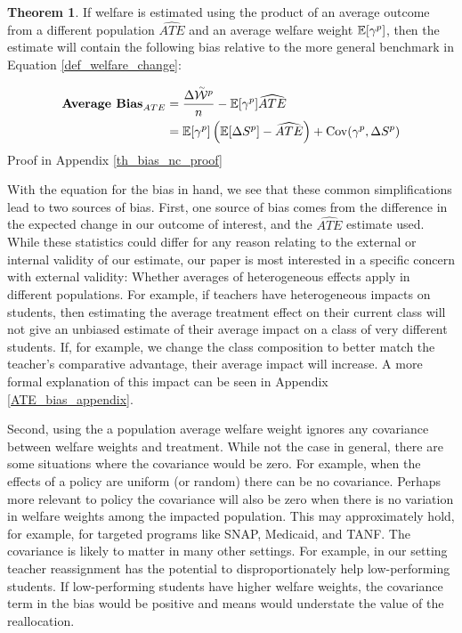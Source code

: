 \documentclass[12pt]{article}
\theoremstyle{definition}
\theoremstyle{definition}
\theoremstyle{definition}
\theoremstyle{definition}
\newtheorem{thm}{Theorem}
\begin{document}
\begin{thm}
\label{thm_bias_nc}
If welfare is estimated using the product of an average outcome from a different population $\widehat{ATE}$ and an average welfare weight $\mathbb{E}[\gamma^p]$, then the estimate will contain the following bias relative to the more general benchmark in Equation \ref{def_welfare_change}: 

\begin{align*}
    \textbf{Average Bias}_{ATE} &= \frac{\Delta \accentset{\sim}{\mathcal{W}}^p}{n} - \mathbb{E}[\gamma^p] \widehat{ATE} \\
   & = \mathbb{E}[\gamma^p] \left (\mathbb{E}[\Delta S^p]-\widehat{ATE} \right ) + \mathrm{Cov}(\gamma^p, \Delta S^p)
\end{align*}
    Proof in Appendix \ref{th_bias_nc_proof}
\end{thm}

With the equation for the bias in hand, we see that these common simplifications lead to two sources of bias. First, one source of bias comes from the difference in the expected change in our outcome of interest, and the $\widehat{ATE}$ estimate used. While these statistics could differ for any reason relating to the external or internal validity of our estimate, our paper is most interested in a specific concern with external validity: Whether averages of heterogeneous effects apply in different populations. For example, if teachers have heterogeneous impacts on students, then estimating the average treatment effect on their current class will not give an unbiased estimate of their average impact on a class of very different students. If, for example, we change the class composition to better match the teacher's comparative advantage, their average impact will increase. A more formal explanation of this impact can be seen in Appendix \ref{ATE_bias_appendix}. 

Second, using the a population average welfare weight ignores any covariance between welfare weights and treatment. While not the case in general, there are some situations where the covariance would be zero. For example, when the effects of a policy are uniform (or random) there can be no covariance. Perhaps more relevant to policy the covariance will also be zero when there is no variation in welfare weights among the impacted population. This may approximately hold, for example, for targeted programs like SNAP, Medicaid, and TANF. The covariance is likely to matter in many other settings. For example, in our setting teacher reassignment has the potential to disproportionately help low-performing students. If low-performing students have higher welfare weights, the covariance term in the bias would be positive and means would understate the value of the reallocation. 
\end{document}
